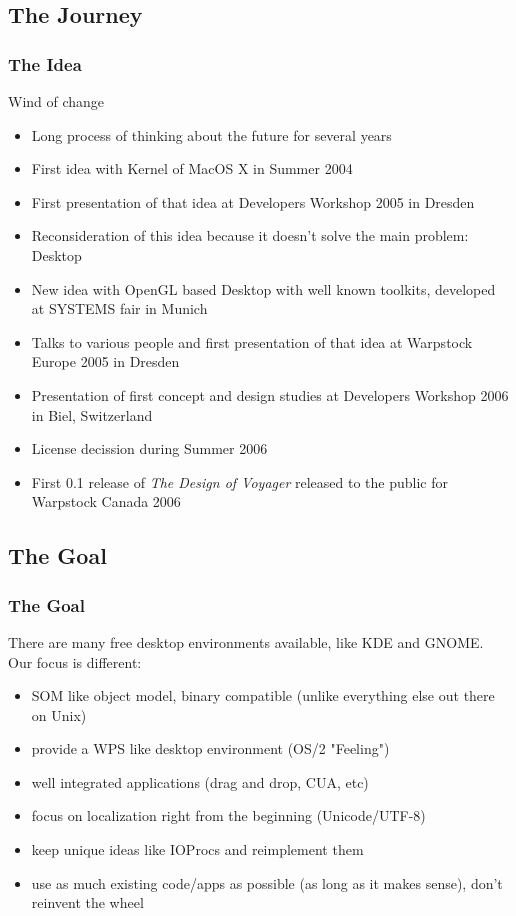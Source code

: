 \documentclass{beamer}
\begin{document}
\subsection{The Journey}
\begin{frame}[allowframebreaks=0.6]
\frametitle{The Idea}
Wind of change
\begin{itemize}[<+->]
  \item Long process of thinking about the future for several years
  \item First idea with Kernel of MacOS X in Summer 2004
  \item First presentation of that idea at Developers Workshop 2005 in Dresden
  \item Reconsideration of this idea because it doesn't solve the main problem: Desktop
  \item New idea with OpenGL based Desktop with well known toolkits, developed at SYSTEMS fair in Munich
  \item Talks to various people and first presentation of that idea at
  Warpstock Europe 2005 in Dresden
  \item Presentation of first concept and design studies at Developers
  Workshop 2006 in Biel, Switzerland
  \item License decission during Summer 2006
  \item First 0.1 release of \textit{The Design of Voyager} released to the
  public for Warpstock Canada 2006
\end{itemize}
\end{frame}

\subsection{The Goal}
\begin{frame}
\frametitle{The Goal}
There are many free desktop environments available, like KDE and GNOME. Our focus is different:
\begin{itemize}
  \item SOM like object model, binary compatible (unlike everything else out there on Unix)
  \item provide a WPS like desktop environment (OS/2 "Feeling")
  \item well integrated applications (drag and drop, CUA, etc)
  \item focus on localization right from the beginning (Unicode/UTF-8)
  \item keep unique ideas like IOProcs and reimplement them
  \item use as much existing code/apps as possible (as long as it makes sense), don't reinvent the wheel
\end{itemize}
\end{frame}
\end{document}
